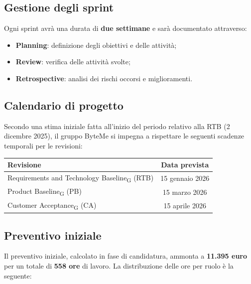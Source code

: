 \documentclass[11pt,a4paper]{article}
\begin{document}
\subsection{Gestione degli sprint}
Ogni sprint avrà una durata di \textbf{due settimane} e sarà documentato attraverso:
\begin{itemize}
    \item \textbf{Planning}: definizione degli obiettivi e delle attività;
    \item \textbf{Review}: verifica delle attività svolte;
    \item \textbf{Retrospective}: analisi dei rischi occorsi e miglioramenti.
\end{itemize}

\subsection{Calendario di progetto}
Secondo una stima iniziale fatta all'inizio del periodo relativo alla RTB (2 dicembre 2025), il gruppo ByteMe si impegna a rispettare le seguenti scadenze temporali per le revisioni:
\begin{center}
    \begin{tabular}{|l|c|}
        \hline
        \textbf{Revisione} & \textbf{Data prevista} \\
        \hline
        Requirements and Technology Baseline\textsubscript{G} (RTB) & 15 gennaio 2026 \\
        \hline
        Product Baseline\textsubscript{G} (PB) & 15 marzo 2026 \\
        \hline
        Customer Acceptance\textsubscript{G} (CA) & 15 aprile 2026 \\
        \hline
    \end{tabular}
\end{center}

\subsection{Preventivo iniziale}
Il preventivo iniziale, calcolato in fase di candidatura, ammonta a \textbf{11.395 euro} per un totale di \textbf{558 ore} di lavoro. La distribuzione delle ore per ruolo è la seguente:
\end{document}
